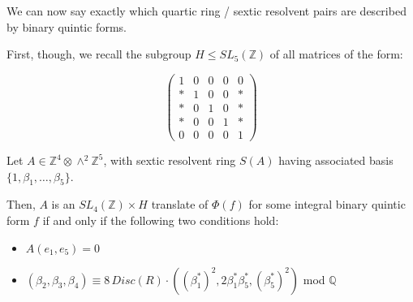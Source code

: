 \documentclass{article}
\begin{document}
We can now say exactly which quartic ring / sextic resolvent pairs are described by binary quintic forms.

First, though, we recall the subgroup $H \leqslant SL_5(\mathbb{Z})$ of all matrices of the form:

\begin{equation}
\begin{pmatrix}
1 & 0 & 0 & 0 & 0 \\
* & 1 & 0 & 0 & * \\
* & 0 & 1 & 0 & * \\
* & 0 & 0 & 1 & * \\
0 & 0 & 0 & 0 & 1
\end{pmatrix}
\end{equation}

\begin{theorem}
Let $A \in \mathbb{Z}^4 \otimes \wedge^2 \mathbb{Z}^5$, with sextic resolvent ring $S(A)$ having associated basis $\{1,\beta_1,\ldots,\beta_5\}$.

Then, $A$ is an $SL_4(\mathbb{Z}) \times H$ translate of $\Phi(f)$ for some integral binary quintic form $f$ if and only if the following two conditions hold:
\begin{itemize}
\item $A(e_1,e_5) = 0$
\item $(\beta_2, \beta_3, \beta_4) \equiv 8 \, Disc(R) \cdot ((\beta_1^*)^2, 2 \beta_1^* \beta_5^*, (\beta_5^*)^2)$ mod $\mathbb{Q}$
\end{itemize}
\end{theorem}
\end{document}
